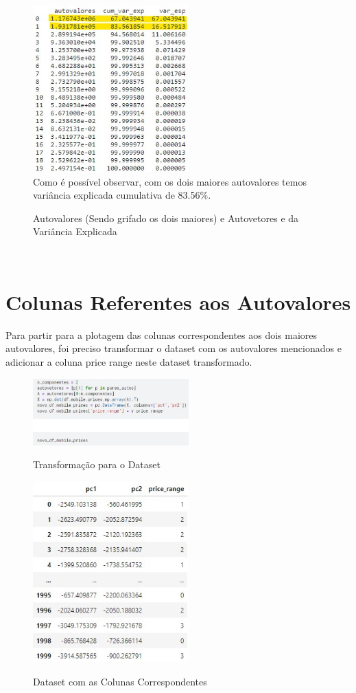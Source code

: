 \documentclass{report}
\begin{document}
\begin{figure}[H]
\centering
\caption{Autovalores (Sendo grifado os dois maiores) e Autovetores e da Variância Explicada}
\includegraphics[width=6cm]{figures/maiores_autovalores.jpg}
\label{figura com os autovalores (grifandos os dois maiores) e autovetores e da variância explicada}
\\Como é possível observar, com os dois maiores autovalores temos variância explicada cumulativa de 83.56\%.
\end{figure}
\
\section{Colunas Referentes aos Autovalores}
Para partir para a plotagem das colunas correspondentes aos dois maiores autovalores, foi preciso transformar o dataset com os autovalores mencionados e adicionar a coluna price range neste dataset transformado.

\begin{figure}[H]
\centering
\caption{Transformação para o Dataset}
\includegraphics[width=6cm]{figures/cod_mudanca_p_dataset.jpg}
\label{figura com o código da transformação para o dataset}
\end{figure}

\begin{figure}[H]
\centering
\caption{Dataset com as Colunas Correspondentes}
\includegraphics[width=6cm]{figures/dataset_transformado.jpg}
\label{figura com o dataset transformado}
\end{figure}
\
\end{document}
